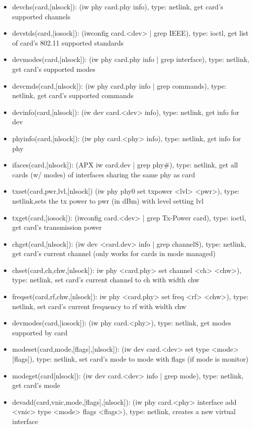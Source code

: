 \documentclass[11pt]{article}
\begin{document}
\begin{appendices}
\begin{itemize}
\item devchs(card,[nlsock]): (iw phy card.phy info), type: netlink, get card's 
supported channels
\item devstds(card,[iosock]): (iwconfig card.<dev> | grep IEEE), type: ioctl, get
list of card's 802.11 supported standards
\item devmodes(card,[nlsock]): (iw phy card.phy info | grep interface), type:
netlink, get card's supported modes
\item devcmds(card,[nlsock]): (iw phy card.phy info | grep commands), type:
netlink, get card's supported commands
\item devinfo(card,[nlsock]): (iw dev card.<dev> info), type: netlink, get info 
for dev 
\item phyinfo(card,[nlsock]): (iw phy card.<phy> info), type: netlink, get info
for phy
\item ifaces(card,[nlsock]): (APX iw card.dev | grep phy\#), type: netlink, get all
cards (w/ modes) of interfaces sharing the same phy as card
\item txset(card,pwr,lvl,[nlsock]) (iw phy phy0 set txpower <lvl> <pwr>), type: 
netlink,sets the tx power to pwr (in dBm) with level setting lvl 
\item txget(card,[iosock]): (iwconfig card.<dev> | grep Tx-Power card), type: 
ioctl, get card's transmission power
\item chget(card,[nlsock]): (iw dev <card.dev> info | grep channelS), type: 
netlink, get card's current channel (only works for cards in mode managed)
\item chset(card,ch,chw,[nlsock]): iw phy <card.phy> set channel <ch> <chw>), 
type: netlink, set card's current channel to ch with width chw
\item freqset(card,rf,chw,[nlsock]): iw phy <card.phy> set freq <rf> <chw>), 
type: netlink, set card's current frequency to rf with width chw
\item devmodes(card,[iosock]): (iw phy card.<phy>), type: netlink, get modes 
supported by card
\item modeset(card,mode,[flags],[nlsock]): (iw dev card.<dev> set type <mode> 
[flags]), type: netlink, set card's mode to mode with flags (if mode is monitor)
\item modeget(card[nlsock]): (iw dev card.<dev> info | grep mode), type: netlink,
get card's mode
\item devadd(card,vnic,mode,[flags],[nlsock]): (iw phy card.<phy> interface add
<vnic> type <mode> flags <flags>), type: netlink, creates a new virtual interface

\end{itemize}
\end{appendices}
\end{document}
